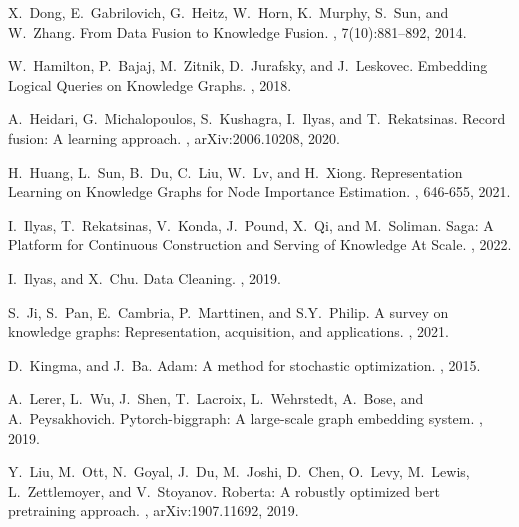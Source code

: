 \documentclass[11pt]{article}
\begin{document}
\begin{thebibliography}{10}
\begin{small}
 X.~Dong, E.~Gabrilovich, G.~Heitz, W.~Horn, K.~Murphy, S.~Sun, and W.~Zhang. \newblock From Data Fusion to Knowledge Fusion. , 7(10):881--892, 2014.



 W.~Hamilton, P.~Bajaj, M.~Zitnik, D.~Jurafsky, and J.~Leskovec. \newblock Embedding Logical Queries on Knowledge Graphs. , 2018.

 A.~Heidari, G.~Michalopoulos, S.~Kushagra, I.~Ilyas, and T.~Rekatsinas. \newblock Record fusion: A learning approach. , arXiv:2006.10208, 2020.

 H.~Huang, L.~Sun, B.~Du, C.~Liu, W.~Lv, and H.~Xiong. \newblock Representation Learning on Knowledge Graphs for Node Importance Estimation. , 646-655, 2021.

 I.~Ilyas, T.~Rekatsinas, V.~Konda, J.~Pound, X.~Qi, and M.~Soliman. \newblock Saga: A Platform for Continuous Construction and Serving of Knowledge At Scale. , 2022.

 I.~Ilyas, and X.~Chu. \newblock Data Cleaning. , 2019.

 S.~Ji, S.~Pan, E.~Cambria, P.~Marttinen, and S.Y.~Philip. \newblock A survey on knowledge graphs: Representation, acquisition, and applications. , 2021.

 D.~Kingma, and J.~Ba. \newblock Adam: A method for stochastic optimization. , 2015.

 A.~Lerer, L.~Wu, J.~Shen, T.~Lacroix, L.~Wehrstedt, A.~Bose, and A.~Peysakhovich. \newblock Pytorch-biggraph: A large-scale graph embedding system. , 2019.


 Y.~Liu, M.~Ott, N.~Goyal, J.~Du, M.~Joshi, D.~Chen, O.~Levy, M.~Lewis, L.~Zettlemoyer, and V.~Stoyanov. \newblock Roberta: A robustly optimized bert pretraining approach. , arXiv:1907.11692, 2019.


\end{small}
\end{thebibliography}
\end{document}
